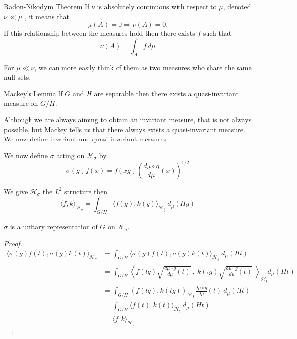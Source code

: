 \documentclass{article}
\begin{document}
\begin{Theorem}{Radon-Nikodym Theorem}
    If $\nu$  is absolutely continuous with respect to $\mu$, denoted $\nu \ll \mu$ , it means that 
    \[%
        \mu(A) = 0 \Rightarrow \nu(A) = 0 .
    \]%
    If this relationship between the measures hold then there exists $f$  such that
    \[%
        \nu(A) = \int_{A} f \ d\mu 
    \]%
\end{Theorem}

For $\mu \ll \nu$, we can more easily think of them as two measures who share the same null sets.

\begin{Theorem}{Mackey's Lemma}
    If $G$ and $H$ are separable then there exists a quasi-invariant measure on $G/H$.\QED
\end{Theorem}

Although we are always aiming to obtain an invariant measure, that is not always possible, but Mackey tells us that there always exists a quasi-invariant measure. We now define invariant and quasi-invariant measures. 

    

    
\begin{define}
    We now define  $\sigma$  acting on $\mathcal{H}_{\sigma}$  by 
    \[%
        \sigma(g)f(x) = f(xg) \left(\frac{d \mu \circ g}{d \mu}(x)\right)^{1/2}
    \]%
\end{define}

\begin{define}
We give $\mathcal{H}_{\sigma}$  the $L^{2}$  structure then 
\[
    \langle f,k \rangle_{\mathcal{H}_{\sigma}} = \int_{G/H} \langle f(g), k(g) \rangle_{\mathcal{H}_{\xi}} \ d_\mu(Hg) 
\]
\end{define}

\begin{theorem}
    $\sigma$ is a unitary representation of $G$ on $\mathcal{H}_{\sigma}$.
\end{theorem}

\begin{proof}
    \[%
        \begin{split}
            \langle \sigma (g) f(t), \sigma(g) k(t) \rangle_{\mathcal{H}_{\sigma}}
            &= \int_{G/H} \langle \sigma(g)f(t), \sigma(g)k(t) \rangle_{\mathcal{H}_{\xi}} \ d_{\mu}(Ht) \\
            &= \int_{G/H} \left\langle f(tg){\sqrt{\frac{d \mu \circ g}{d \mu}(t)}} \ ,\ k(tg){\sqrt{\frac{d \mu \circ g}{d \mu}(t)}}  \ \right\rangle_{\mathcal{H}_{\xi}} d_{\mu}(Ht) \\
            &= \int_{G/H} \left\langle f(tg), k(tg) \right\rangle_{\mathcal{H}_{\xi}} \frac{d \mu \circ g}{d \mu}(t) \ d_{\mu}(Ht) \\
            &= \int_{G/H} \langle f(t), k(t) \rangle_{\mathcal{H}_{\xi}} \ d_{\mu}(Ht) \\
            &= \langle f,k \rangle_{\mathcal{H}_{\sigma}}
        \end{split} 
    \]%
\end{proof}
\end{document}
